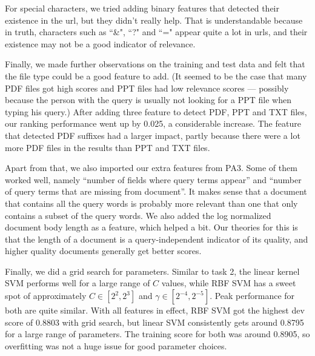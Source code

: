 \documentclass[10pt,twocolumn]{article}
\begin{document}
For special characters, we tried adding binary features that detected their existence in the url, but they didn't really help. That is understandable because in truth, characters such as ``\&", ``?" and ``=" appear quite a lot in urls, and their existence may not be a good indicator of relevance.

Finally, we made further observations on the training and test data and felt that the file type could be a good feature to add. (It seemed to be the case that many PDF files got high scores and PPT files had low relevance scores --- possibly because the person with the query is usually not looking for a PPT file when typing his query.) After adding three feature to detect PDF, PPT and TXT files, our ranking performance went up by 0.025, a considerable increase. The feature that detected PDF suffixes had a larger impact, partly because there were a lot more PDF files in the results than PPT and TXT files.

Apart from that, we also imported our extra features from PA3. Some of them worked well, namely ``number of fields where query terms appear'' and ``number of query terms that are missing from document''. It makes sense that a document that contains all the query words is probably more relevant than one that only contains a subset of the query words. We also added the log normalized document body length as a feature, which helped a bit. Our theories for this is that the length of a document is a query-independent indicator of its quality, and higher quality documents generally get better scores.

Finally, we did a grid search for parameters. Similar to task 2, the linear kernel SVM performs well for a large range of $C$ values, while RBF SVM has a sweet spot of approximately $C\in[2^{2},2^{3}]$ and $\gamma\in[2^{-4},2^{-5}]$. Peak performance for both are quite similar. With all features in effect, RBF SVM got the highest dev score of 0.8803 with grid search, but linear SVM consistently gets around 0.8795 for a large range of parameters. The training score for both was around 0.8905, so overfitting was not a huge issue for good parameter choices.
\end{document}
